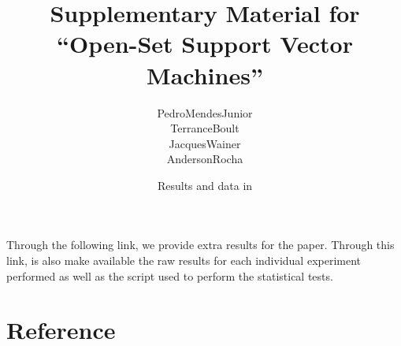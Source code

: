 



\renewcommand\highlightauthorname[1]{#1}

\title{Supplementary Material for \\``Open-Set Support Vector Machines''}
\author{\gls{PedroMendesJunior}\\%
  \gls{TerranceBoult}\\%
  \gls{JacquesWainer}\\%
  \gls{AndersonRocha}\\%
}
\date{Results and data in }



\maketitle

Through the following link, we provide extra results for the paper.
Through this link, is also make available the raw results for each individual experiment performed as well as the script used to perform the statistical tests.

\begin{center}
\end{center}

\section*{Reference}

\begin{publications}
  \\

\end{publications}




